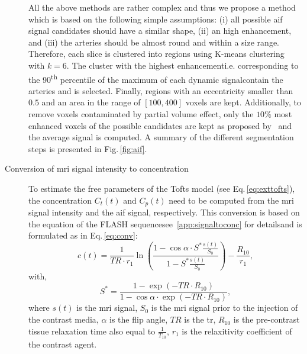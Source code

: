 \begin{description}
    All the above methods are rather complex and thus we propose a method which is based on the following simple assumptions:
    (i) all possible \ac{aif} signal candidates should have a similar shape,
    (ii) an high enhancement, and
    (iii) the arteries should be almost round and within a size range.
    Therefore, each slice is clustered into regions using K-means clustering with $k=6$.
    The cluster with the highest enhancement\textemdash i.e. corresponding to the 90\textsuperscript{th} percentile of the maximum of each dynamic signal\textemdash contain the arteries and is selected.
    Finally, regions with an eccentricity smaller than $0.5$ and an area in the range of $[100, 400]$ voxels are kept.
    Additionally, to remove voxels contaminated by partial volume effect, only the $10\%$ most enhanced voxels of the possible candidates are kept as proposed by~\citep{schabel2008uncertainty} and the average signal is computed.
    A summary of the different segmentation steps is presented in Fig.\,\ref{fig:aif}.
    \item[Conversion of \ac{mri} signal intensity to concentration] To estimate the free parameters of the Tofts model (see Eq.\,\eqref{eq:exttofts}), the concentration $C_t(t)$ and $C_p(t)$ need to be computed from the \ac{mri} signal intensity and the \ac{aif} signal, respectively.
      This conversion is based on the equation of the FLASH sequence\textemdash see~\ref{app:signaltoconc} for details\textemdash and is formulated as in Eq.\,\eqref{eq:conv}:
      \begin{equation}
        c(t) = \frac{1}{TR \cdot r_1} \ln\left( \frac{1 - \cos \alpha \cdot S^{*}\frac{s(t)}{S_0}}{1 - S^{*}\frac{s(t)}{S_0}} \right) - \frac{R_{10}}{r_1} ,
        \label{eq:conv}
      \end{equation}
      \noindent with,
      \begin{equation}
        S^{*} = \frac{1 - \exp(- TR \cdot R_{10})}{1 - \cos \alpha \cdot \exp(- TR \cdot R_{10})} ,
        \label{eq:sstarconv}
      \end{equation}
      \noindent where $s(t)$ is the \ac{mri} signal, $S_0$ is the \ac{mri} signal prior to the injection of the contrast media, $\alpha$ is the flip angle, $TR$ is the \acf{tr}, $R_{10}$ is the pre-contrast tissue relaxation time also equal to $\frac{1}{T_{10}}$, $r_1$ is the relaxitivity coefficient of the contrast agent.


\end{description}

